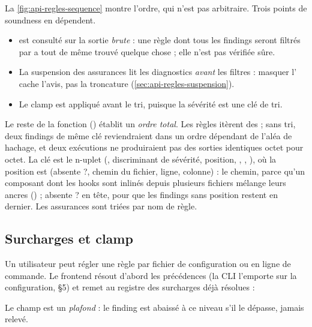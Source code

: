 La \cref{fig:api-regles-sequence} montre l'ordre, qui n'est pas arbitraire. Trois points de soundness en dépendent.
\begin{itemize}
  \item {} est consulté sur la sortie \emph{brute} : une règle dont tous les findings seront filtrés par  a tout de même trouvé quelque chose ; elle n'est pas \og vérifiée sûre\fg.
  \item La suspension des assurances lit les diagnostics \emph{avant} les filtres : masquer l'\Info{}  cache l'avis, pas la troncature (\cref{sec:api-regles-suspension}).
  \item Le clamp est appliqué avant le tri, puisque la sévérité est une clé de tri.
\end{itemize}

Le reste de la fonction () établit un \emph{ordre total}. Les règles itèrent des  ; sans tri, deux findings de même clé reviendraient dans un ordre dépendant de l'aléa de hachage, et deux exécutions ne produiraient pas des sorties identiques octet pour octet. La clé est le n-uplet (, discriminant de sévérité, position, , , ), où la position est (absente ?, chemin du fichier, ligne, colonne) : le chemin, parce qu'un composant dont les hooks sont inlinés depuis plusieurs fichiers mélange leurs ancres () ; \og absente ?\fg{} en tête, pour que les findings sans position restent en dernier. Les assurances sont triées par nom de règle.

\subsection{Surcharges et clamp}
\label{sec:api-regles-clamp}

Un utilisateur peut régler une règle par fichier de configuration ou en ligne de commande. Le frontend résout d'abord les précédences (la CLI l'emporte sur la configuration,  §5) et remet au registre des surcharges déjà résolues :


Le champ  est un \emph{plafond} : le finding est abaissé à ce niveau s'il le dépasse, jamais relevé.


